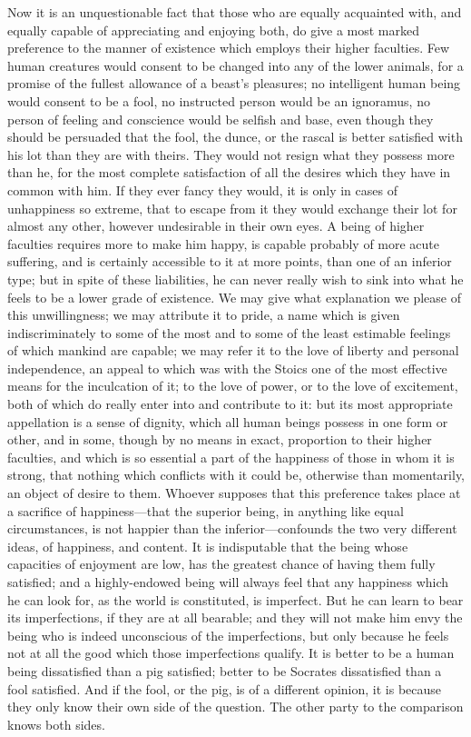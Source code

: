Now it is an unquestionable fact that those who are equally acquainted
with, and equally capable of appreciating and enjoying both, do give a
most marked preference to the manner of existence which employs their
higher faculties. Few human creatures would consent to be changed into
any of the lower animals, for a promise of the fullest allowance of a
beast's pleasures; no intelligent human being would consent to be a
fool, no instructed person would be an ignoramus, no person of feeling
and conscience would be selfish and base, even though they should be
persuaded that the fool, the dunce, or the rascal is better satisfied
with his lot than they are with theirs. They would not resign what
they possess more than he, for  the most complete
satisfaction of all the desires which they have in common with him. If
they ever fancy they would, it is only in cases of unhappiness so
extreme, that to escape from it they would exchange their lot for
almost any other, however undesirable in their own eyes. A being of
higher faculties requires more to make him happy, is capable probably
of more acute suffering, and is certainly accessible to it at more
points, than one of an inferior type; but in spite of these
liabilities, he can never really wish to sink into what he feels to be
a lower grade of existence. We may give what explanation we please of
this unwillingness; we may attribute it to pride, a name which is
given indiscriminately to some of the most and to some of the least
estimable feelings of which mankind are capable; we may refer it to
the love of liberty and personal independence, an appeal to which was
with the Stoics one of the most effective means for the inculcation of
it; to the love of power, or to the love of excitement, both of which
do really enter into and contribute to it: but its most appropriate
appellation is a sense of dignity, which all human beings possess in
one form or other, and in some, though by no means in exact,
proportion to their higher faculties, and which is so essential a part
of the happiness of those in whom it is strong, that nothing which
conflicts with it could be, otherwise than momentarily, an object of
desire to them. Whoever supposes that this preference takes place at a
sacrifice of hap\-pi\-ness---that the superior being, in anything like
equal circumstances, is not happier than the
in\-fe\-ri\-or---con\-founds the two very different ideas, of
happiness, and content. It is indisputable that the being whose
capacities of  enjoyment are low, has the greatest chance of
having them fully satisfied; and a highly-endowed being will always
feel that any happiness which he can look for, as the world is
constituted, is imperfect. But he can learn to bear its imperfections,
if they are at all bearable; and they will not make him envy the being
who is indeed unconscious of the imperfections, but only because he
feels not at all the good which those imperfections qualify. It is
better to be a human being dissatisfied than a pig satisfied; better
to be Socrates dissatisfied than a fool satisfied. And if the fool, or
the pig, is of a different opinion, it is because they only know their
own side of the question. The other party to the comparison knows both
sides.

